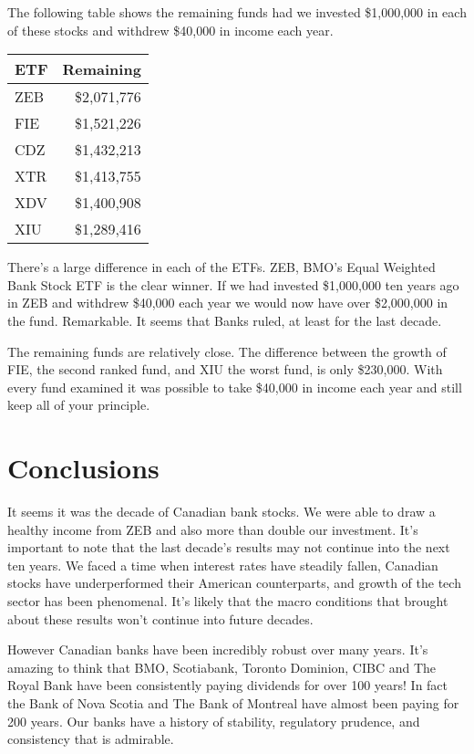 \documentclass[11pt]{article}
\begin{document}
    The following table shows the remaining funds had we invested
\$1,000,000 in each of these stocks and withdrew \$40,000 in income each
year.

\begin{tabular}{lr}
\toprule
ETF &  Remaining \\
\midrule
ZEB &    \$2,071,776 \\
FIE &    \$1,521,226 \\
CDZ &    \$1,432,213 \\
XTR &    \$1,413,755 \\
XDV &    \$1,400,908 \\
XIU &    \$1,289,416 \\
\bottomrule
\end{tabular}

     There's a large difference in each of the ETFs. ZEB, BMO's Equal
Weighted Bank Stock ETF is the clear winner. If we had invested
\$1,000,000 ten years ago in ZEB and withdrew \$40,000 each year we
would now have over \$2,000,000 in the fund. Remarkable. It seems that
Banks ruled, at least for the last decade.

The remaining funds are relatively close. The difference between the
growth of FIE, the second ranked fund, and XIU the worst fund, is only
\$230,000. With every fund examined it was possible to take \$40,000 in
income each year and still keep all of your principle.

    \hypertarget{conclusions}{%
\section{Conclusions}\label{conclusions}}

    It seems it was the decade of Canadian bank stocks. We were able to draw
a healthy income from ZEB and also more than double our investment. It's
important to note that the last decade's results may not continue into
the next ten years. We faced a time when interest rates have steadily
fallen, Canadian stocks have underperformed their American counterparts,
and growth of the tech sector has been phenomenal. It's likely that the
macro conditions that brought about these results won't continue into
future decades.

However Canadian banks have been incredibly robust over many years. It's
amazing to think that BMO, Scotiabank, Toronto Dominion, CIBC and The
Royal Bank have been consistently paying dividends for over 100 years!
In fact the Bank of Nova Scotia and The Bank of Montreal have almost
been paying for 200 years. Our banks have a history of stability,
regulatory prudence, and consistency that is admirable.
\end{document}
